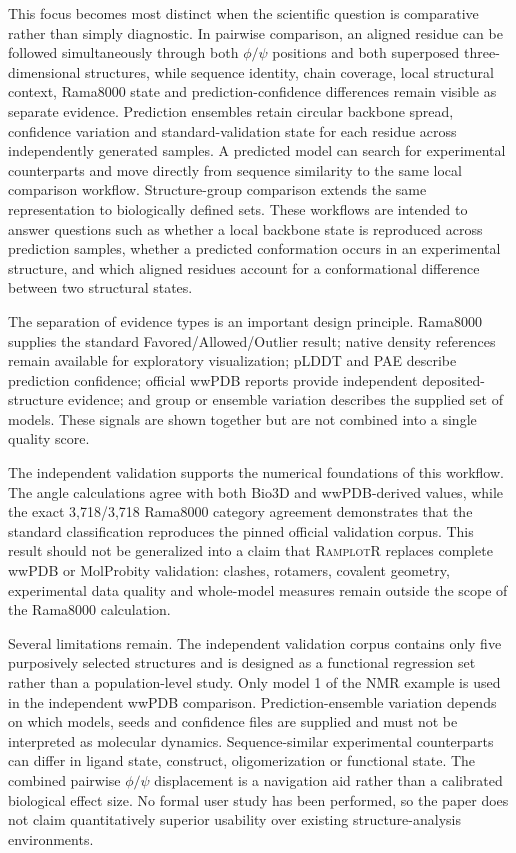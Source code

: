 \documentclass[11pt]{article}
\newcommand{\ramplotr}{\textsc{RamplotR}\xspace}
\begin{document}
This focus becomes most distinct when the scientific question is comparative rather than simply diagnostic. In pairwise comparison, an aligned residue can be followed simultaneously through both $\phi/\psi$ positions and both superposed three-dimensional structures, while sequence identity, chain coverage, local structural context, Rama8000 state and prediction-confidence differences remain visible as separate evidence. Prediction ensembles retain circular backbone spread, confidence variation and standard-validation state for each residue across independently generated samples. A predicted model can search for experimental counterparts and move directly from sequence similarity to the same local comparison workflow. Structure-group comparison extends the same representation to biologically defined sets. These workflows are intended to answer questions such as whether a local backbone state is reproduced across prediction samples, whether a predicted conformation occurs in an experimental structure, and which aligned residues account for a conformational difference between two structural states.

The separation of evidence types is an important design principle. Rama8000 supplies the standard Favored/Allowed/Outlier result; native density references remain available for exploratory visualization; pLDDT and PAE describe prediction confidence; official wwPDB reports provide independent deposited-structure evidence; and group or ensemble variation describes the supplied set of models. These signals are shown together but are not combined into a single quality score.

The independent validation supports the numerical foundations of this workflow. The angle calculations agree with both Bio3D and wwPDB-derived values, while the exact 3,718/3,718 Rama8000 category agreement demonstrates that the standard classification reproduces the pinned official validation corpus. This result should not be generalized into a claim that \ramplotr replaces complete wwPDB or MolProbity validation: clashes, rotamers, covalent geometry, experimental data quality and whole-model measures remain outside the scope of the Rama8000 calculation.

Several limitations remain. The independent validation corpus contains only five purposively selected structures and is designed as a functional regression set rather than a population-level study. Only model 1 of the NMR example is used in the independent wwPDB comparison. Prediction-ensemble variation depends on which models, seeds and confidence files are supplied and must not be interpreted as molecular dynamics. Sequence-similar experimental counterparts can differ in ligand state, construct, oligomerization or functional state. The combined pairwise $\phi/\psi$ displacement is a navigation aid rather than a calibrated biological effect size. No formal user study has been performed, so the paper does not claim quantitatively superior usability over existing structure-analysis environments.
\end{document}
